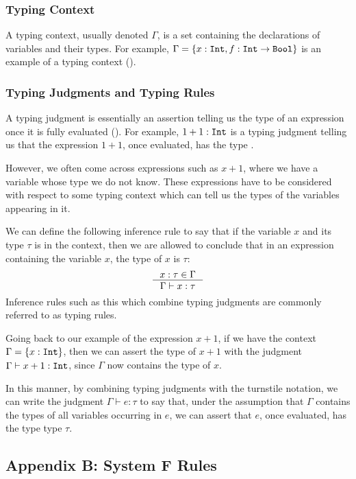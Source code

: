 \subsubsection*{Typing Context}
A typing context, usually denoted $\Gamma$, is a set containing the declarations of variables and their types. For example, $\Gamma = \{x:\texttt{Int}{}, f:\texttt{Int}{} \rightarrow \texttt{Bool}{}\}$ is an example of a typing context (\cite{pierce}).

\subsubsection*{Typing Judgments and Typing Rules}
A typing judgment is essentially an assertion telling us the type of an expression once it is fully evaluated (\cite{pierce}). For example, $1+1:\texttt{Int}{}$ is a typing judgment telling us that the expression $1+1$, once evaluated, has the type \Intt{}. 

However, we often come across expressions such as $x+1$, where we have a variable whose type we do not know. These expressions have to be considered with respect to some typing context which can tell us the types of the variables appearing in it.

We can define the following inference rule to say that if the variable $x$ and its type $\tau$ is in the context, then we are allowed to conclude that in an expression containing the variable $x$, the type of $x$ is $\tau$:
\begin{align*}
\inference{
  x:\tau \in \Gamma
}{\Gamma \vdash x:\tau}
\end{align*}
Inference rules such as this which combine typing judgments are commonly referred to as typing rules.

Going back to our example of the expression $x+1$, if we have the context $\Gamma = \{x:\texttt{Int}{}\}$, then we can assert the type of $x+1$ with the judgment $\Gamma \vdash x + 1 : \texttt{Int}{}$, since $\Gamma$ now contains the type of $x$.

In this manner, by combining typing judgments with the turnstile notation, we can write the judgment $\Gamma \vdash e:\tau$ to say that, under the assumption that $\Gamma$ contains the types of all variables occurring in $e$, we can assert that $e$, once evaluated, has the type type $\tau$.


\subsection{Appendix B: System F Rules}
\label{sec:AppB}

